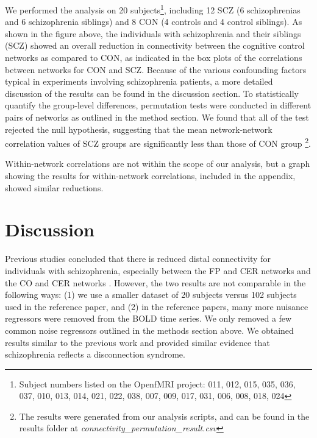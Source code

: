 \documentclass[11pt]{article}
\begin{document}
We performed the analysis on 20 subjects\footnote{Subject numbers listed on the OpenfMRI project: 011, 012, 015, 035, 036, 037, 010, 013, 014, 021, 022, 038, 007, 009, 017, 031, 006, 008, 018, 024}, including 12 SCZ (6 schizophrenias and 6 schizophrenia siblings) and 8 CON (4 controls and 4 control siblings). As shown in the figure above, the individuals with schizophrenia and their siblings (SCZ) showed an overall reduction in connectivity between the cognitive control networks as compared to CON, as indicated in the box plots of the correlations between networks for CON and SCZ. Because of the various confounding factors typical in experiments involving schizophrenia patients, a more detailed discussion of the results can be found in the discussion section.  
To statistically quantify the group-level differences, permutation tests were conducted in different pairs of networks as outlined in the method section. We found that all of the test rejected the null hypothesis, suggesting that the mean network-network correlation values of SCZ groups are significantly less than those of CON group \footnote{The results were generated from our analysis scripts, and can be found in the results folder at \textit{connectivity\_permutation\_result.csv}}.

Within-network correlations are not within the scope of our analysis, but a graph showing the results for within-network correlations, included in the appendix, showed similar reductions.


\section{Discussion}

Previous studies concluded that there is reduced distal connectivity for individuals with schizophrenia, especially between the FP and CER networks and the CO and CER networks \cite{repovs2011, repovs2012}. However, the two results are not comparable in the following ways: (1) we use a smaller dataset of 20 subjects versus 102 subjects used in the reference paper, and (2) in the reference papers, many more nuisance regressors were removed from the BOLD time series. We only removed a few common noise regressors outlined in the methods section above. We obtained results similar to the previous work and provided similar evidence that schizophrenia reflects a disconnection syndrome.
\end{document}
